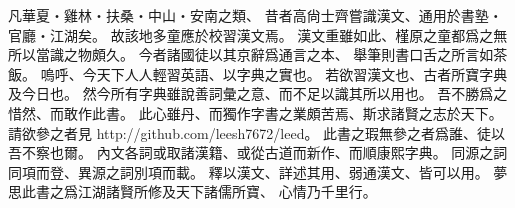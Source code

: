 凡華夏・雞林・扶桑・中山・安南之類、
昔者高尙士齊嘗識漢文、通用於書塾・官廳・江湖矣。
故該地多童應於校習漢文焉。
漢文重雖如此、槿原之童都爲之無所以當識之物頗久。
今者諸國徒以其京辭爲通言之本、
舉筆則書口舌之所言如茶飯。
嗚呼、今天下人人輕習英語、以字典之實也。
若欲習漢文也、古者所寶字典及今日也。
然今所有字典雖說善詞彙之意、而不足以識其所以用也。
吾不勝爲之惜然、而敢作此書。
此心雖丹、而獨作字書之業頗苦焉、斯求諸賢之志於天下。
請欲參之者見 http://github.com/leesh7672/leed。
此書之瑕無參之者爲誰、徒以吾不察也爾。
內文各詞或取諸漢籍、或從古道而新作、而順康熙字典。
同源之詞同項而登、異源之詞別項而載。
釋以漢文、詳述其用、弱通漢文、皆可以用。
夢思此書之爲江湖諸賢所修及天下諸儒所寶、
心情乃千里行。
